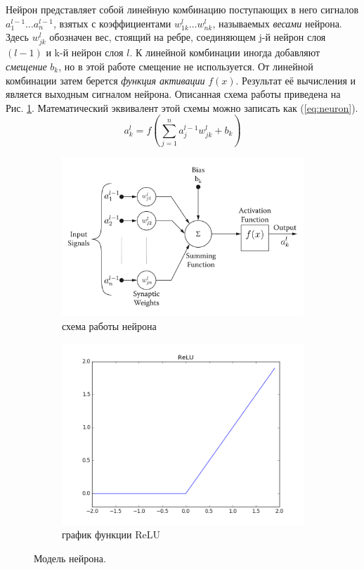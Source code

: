 \documentclass[a4paper,12pt]{article}
\theoremstyle{remark}
\begin{document}
	Нейрон представляет собой линейную комбинацию поступающих в него сигналов $a_1^{l-1} \dots a_n^{l-1}$, взятых с коэффициентами $w_{1k}^l \dots w_{nk}^l$, называемых \textit{весами} нейрона. Здесь $w_{jk}^l$ обозначен вес, стоящий на ребре, соединяющем j-й нейрон слоя $(l-1)$ и k-й нейрон слоя $l$. К линейной комбинации иногда добавляют \textit{смещение} $b_k$, но в этой работе смещение не используется. От линейной комбинации затем берется \textit{функция активации} $f(x)$. Результат её вычисления и является выходным сигналом нейрона. Описанная схема работы приведена на Рис. \ref{fig:neuron_a}. Математический эквивалент этой схемы можно записать как (\ref{eq:neuron}).
	\begin{equation}\label{eq:neuron}
		a_k^l = f(\sum_{j=1}^{n} a_j^{l-1} w_{jk}^l + b_k)
	\end{equation}
	
	\begin{figure}[h]
		\begin{subfigure}[t]{0.6\textwidth}
			\includegraphics[width=\linewidth]{neuron.png}
			\caption{схема работы нейрона}
			\label{fig:neuron_a}
		\end{subfigure}
		\begin{subfigure}[t]{0.4\textwidth}
			\includegraphics[width=\linewidth]{relu.png}
			\caption{график функции ReLU}
			\label{fig:neuron_b}
		\end{subfigure}
		\caption{Модель нейрона.}
		\label{fig:neuron}
	\end{figure}
	
\end{document}
